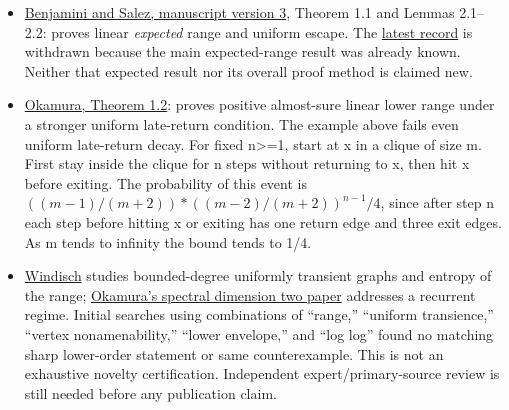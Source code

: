 \documentclass[11pt]{article}
\newcommand{\tightlist}{\setlength{\itemsep}{2pt}\setlength{\parskip}{0pt}}
\begin{document}
\begin{itemize}
\tightlist
\item
  \href{https://arxiv.org/html/2602.11051v3}{Benjamini and Salez, manuscript version 3}, Theorem 1.1 and Lemmas 2.1--2.2: proves linear \emph{expected} range and uniform escape. The \href{https://arxiv.org/abs/2602.11051}{latest record} is withdrawn because the main expected-range result was already known. Neither that expected result nor its overall proof method is claimed new.
\item
  \href{https://arxiv.org/html/2606.00648v1}{Okamura, Theorem 1.2}: proves positive almost-sure linear lower range under a stronger uniform late-return condition. The example above fails even uniform late-return decay. For fixed n\textgreater=1, start at x in a clique of size m. First stay inside the clique for n steps without returning to x, then hit x before exiting. The probability of this event is \(((m-1)/(m+2))*((m-2)/(m+2))^{n-1}/4\), since after step n each step before hitting x or exiting has one return edge and three exit edges. As m tends to infinity the bound tends to 1/4.
\item
  \href{https://arxiv.org/abs/1001.0355}{Windisch} studies bounded-degree uniformly transient graphs and entropy of the range; \href{https://arxiv.org/abs/1903.07990}{Okamura's spectral dimension two paper} addresses a recurrent regime. Initial searches using combinations of ``range,'' ``uniform transience,'' ``vertex nonamenability,'' ``lower envelope,'' and ``log log'' found no matching sharp lower-order statement or same counterexample. This is not an exhaustive novelty certification. Independent expert/primary-source review is still needed before any publication claim.
\end{itemize}
\end{document}
